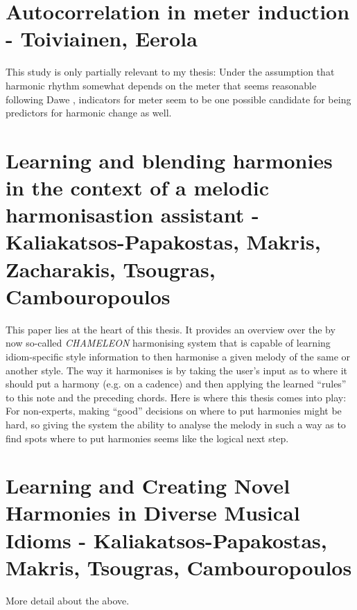 \documentclass[a4paper,12pt]{report}
\begin{document}
\section{Autocorrelation in meter induction - Toiviainen, Eerola}
\cite{toiviainen2006autocorrelation}
This study is only partially relevant to my thesis: Under the assumption that harmonic rhythm somewhat
depends on the meter that seems reasonable following Dawe \cite{dawe1993rhythm}, indicators for
meter seem to be one possible candidate for being predictors for harmonic change as well.

\section{Learning and blending harmonies in the context of a melodic harmonisastion assistant -
Kaliakatsos-Papakostas, Makris, Zacharakis, Tsougras, Cambouropoulos}
\cite{kaliakatsos2016overview}
This paper lies at the heart of this thesis. It provides an overview over the by now so-called \textit{
CHAMELEON} harmonising system that is capable of learning idiom-specific style information to then
harmonise a given melody of the same or another style. The way it harmonises is by taking the user's
input as to where it should put a harmony (e.g. on a cadence) and then applying the learned ``rules'' to
this note and the preceding chords. Here is where this thesis comes into play: For non-experts, making
``good'' decisions on where to put harmonies might be hard, so giving the system the ability to analyse
the melody in such a way as to find spots where to put harmonies seems like the logical next step.

\section{Learning and Creating Novel Harmonies in Diverse Musical Idioms - Kaliakatsos-Papakostas,
Makris, Tsougras, Cambouropoulos}
\cite{kaliakatsos2016learning}
More detail about the above.
\end{document}
